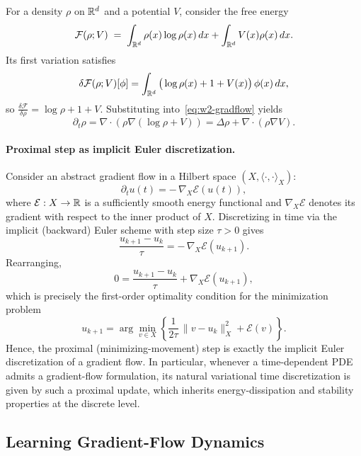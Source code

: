 \documentclass[11pt]{article}
\begin{document}
\begin{example}
For a density $\rho$ on ${{\mathbb{R}}}^d$ and a potential $V$, consider the free energy
\begin{equation}
\label{eq:free-energy}
\mathcal F(\rho;V)
\;=\;
\int_{{{\mathbb{R}}}^d} \rho(x)\log\rho(x)\,dx
+
\int_{{{\mathbb{R}}}^d} V(x)\rho(x)\,dx.
\end{equation}
Its first variation satisfies
\begin{equation}
\delta\mathcal F(\rho;V)[\phi]
=
\int_{{{\mathbb{R}}}^d}\big(\log\rho(x)+1+V(x)\big)\,\phi(x)\,dx,
\end{equation}
so $\frac{\delta\mathcal F}{\delta\rho}=\log\rho+1+V$. Substituting into~\eqref{eq:w2-gradflow} yields
\begin{equation}
\partial_t \rho
=
\nabla\cdot\!\left(\rho\nabla(\log\rho+V)\right)
=
\Delta\rho+\nabla\cdot(\rho\nabla V).
\end{equation}
\end{example}

\paragraph{Proximal step as implicit Euler discretization.}
Consider an abstract gradient flow in a Hilbert space $(X,\langle\cdot,\cdot\rangle_X)$:
\[
\partial_t u(t) = -\,\nabla_X \mathcal E(u(t)),
\]
where $\mathcal E:X\to{{\mathbb{R}}}$ is a sufficiently smooth energy functional and $\nabla_X \mathcal E$ denotes its gradient with respect to the inner product of $X$.
Discretizing in time via the implicit (backward) Euler scheme with step size $\tau>0$ gives
\[
\frac{u_{k+1}-u_k}{\tau}
=
-\,\nabla_X \mathcal E(u_{k+1}).
\]
Rearranging,
\[
0
=
\frac{u_{k+1}-u_k}{\tau}
+
\nabla_X \mathcal E(u_{k+1}),
\]
which is precisely the first-order optimality condition for the minimization problem
\[
u_{k+1}
=
\arg\min_{v\in X}
\left\{
\frac{1}{2\tau}\,\|v-u_k\|_X^2
+
\mathcal E(v)
\right\}.
\]
Hence, the proximal (minimizing-movement) step is exactly the implicit Euler discretization of a gradient flow.
In particular, whenever a time-dependent PDE admits a gradient-flow formulation, its natural variational time discretization is given by such a proximal update, which inherits energy-dissipation and stability properties at the discrete level.

\iffalse
\subsection{Learning Gradient-Flow Dynamics}
\label{sec:learning_gf}
\end{document}
